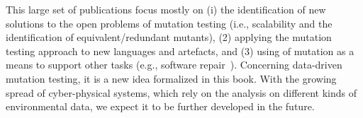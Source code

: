 {This large set of publications focus mostly on (i) the identification of new solutions to the open problems of mutation testing (i.e., scalability and the identification of equivalent/redundant mutants), (2) applying the mutation testing approach to new languages and artefacts, and (3) using of mutation as a means to support other tasks (e.g., software repair~\cite{le2011genprog}).}
Concerning data-driven mutation testing, it is a new idea formalized in this book. With the growing spread of cyber-physical systems, which rely on the analysis on different kinds of environmental data, we expect it to be further developed in the future.


